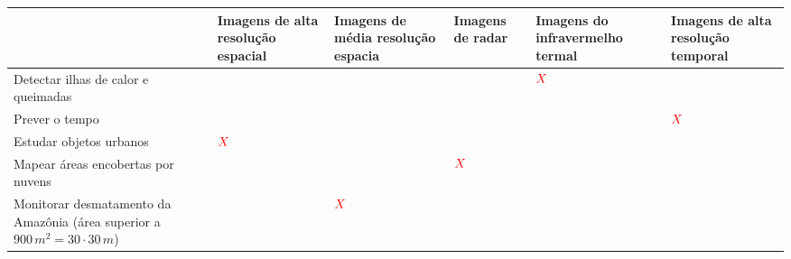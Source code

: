 \documentclass[a4paper, 12pt]{article}
\newcommand{\red}[1]{\textcolor{red}{#1}}
\begin{document}
\begin{flushleft}
\begin{itemize}
\begin{itemize}
\begin{center}
\begin{tabular}
{                        }
                            \hline
                            $\quad$ & Imagens de alta resolução espacial & Imagens de média resolução espacia & Imagens de radar & Imagens do infravermelho termal & Imagens de alta resolução temporal \\ \hline
                            Detectar ilhas de calor e queimadas & $\quad$ & $\quad$ & $\quad$ & $\red{X}$ & $\quad$ \\ \hline
                            Prever o tempo & $\quad$ & $\quad$ & $\quad$ & $\quad$ & $\red{X}$ \\ \hline
                            Estudar objetos urbanos & $\red{X}$ & $\quad$ & $\quad$ & $\quad$ & $\quad$ \\ \hline
                            Mapear áreas encobertas por nuvens & $\quad$ & $\quad$ & $\red{X}$ & $\quad$ & $\quad$ \\ \hline
                            Monitorar desmatamento da Amazônia (área superior a $900 \, m^2 = 30 \cdot  30 \, m$) & $\quad$ & $\red{X}$ & $\quad$ & $\quad$ & $\quad$ \\ \hline
                        \end{tabular} \end{center}
                \end{itemize}


\end{itemize}
\end{flushleft}
\end{document}
